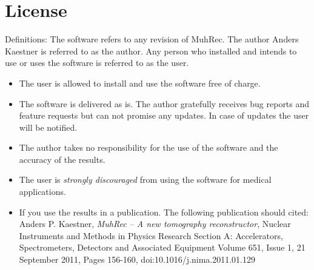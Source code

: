 \documentclass[a4paper]{scrreprt}
\begin{document}


\appendix
\chapter{License}
Definitions: The software refers to any revision of MuhRec. The author Anders
Kaestner is referred to as the author. Any person who installed and intends to
use or uses the software is referred to as the user.
\begin{itemize}
\item The user is allowed to install and use the software free of charge.
\item The software is delivered as is. The author gratefully receives bug
reports and feature requests but can not promise any updates. In case of updates
the user will be notified.
\item The author takes no responsibility for the use of the software and the
accuracy of the results.
\item The user is \emph{strongly discouraged} from using the software for
medical applications.
\item If you use the results in a publication. The following publication should
cited: Anders P. Kaestner, \emph{MuhRec -- A new tomography reconstructor},
Nuclear Instruments and Methods in Physics Research Section A:
Accelerators, Spectrometers, Detectors and Associated Equipment
Volume 651, Issue 1, 21 September 2011, Pages 156-160,
doi:10.1016/j.nima.2011.01.129

\end{itemize}
\end{document}
